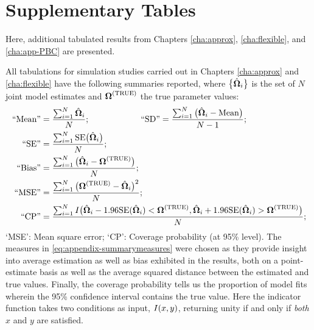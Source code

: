 \chapter{Supplementary Tables}\label{cha:appendix-supplementary-tables}
Here, additional tabulated results from Chapters \ref{cha:approx}, \ref{cha:flexible}, and \ref{cha:app-PBC} are presented.

All tabulations for simulation studies carried out in Chapters \ref{cha:approx} and \ref{cha:flexible} have the following summaries reported, where $\big\{\hat{\bm{\Omega}}_i\big\}$ is the set of $N$ joint model estimates and $\bm{\mathrm{\Omega}}^{(\mathrm{TRUE})}$ the true parameter values:
\begin{equation}
    \begin{aligned}
        \mathrm{``Mean"} &= \frac{\sum_{i=1}^N\hat{\bm{\Omega}}_i}{N};\qquad\qquad\qquad\mathrm{``SD"} = \frac{\sum_{i=1}^N\big(\hat{\bm{\Omega}}_i-\mathrm{Mean}\big)}{N-1};\\
        \mathrm{``SE"} &= \frac{\sum_{i=1}^N\mathrm{SE}\big(\hat{\bm{\Omega}}_i\big)}{N};\\
        \mathrm{``Bias"} &= \frac{\sum_{i=1}^N\big(\hat{\bm{\Omega}}_i-\bm{\mathrm{\Omega}}^{(\mathrm{TRUE})}\big)}{N};\\\
        \mathrm{``MSE"} &= \frac{\sum_{i=1}^N\big(\bm{\mathrm{\Omega}}^{(\mathrm{TRUE})}-\hat{\bm{\Omega}}_i\big)^2}{N};\\
        \mathrm{``CP"} &= \frac{\sum_{i=1}^N I\big(\hat{\bm{\Omega}}_i-1.96\mathrm{SE}(\hat{\bm{\Omega}}_i)<\bm{\mathrm{\Omega}}^{(\mathrm{TRUE})},\hat{\bm{\Omega}}_i+1.96\mathrm{SE}(\hat{\bm{\Omega}}_i)>\bm{\mathrm{\Omega}}^{(\mathrm{TRUE})}\big)}{N};
    \end{aligned}
\label{eq:appendix-summarymeasures}
\end{equation}
`MSE': Mean square error; `CP': Coverage probability (at 95\% level). The measures in \eqref{eq:appendix-summarymeasures} were chosen as they provide insight into average estimation as well as bias exhibited in the results, both on a point-estimate basis as well as the average squared distance between the estimated and true values. Finally, the coverage probability tells us the proportion of model fits wherein the 95\% confidence interval contains the true value. Here the indicator function takes two conditions as input, $I\!\left( x, y\right)$, returning unity if and only if \textit{both} $x$ and $y$ are satisfied.

